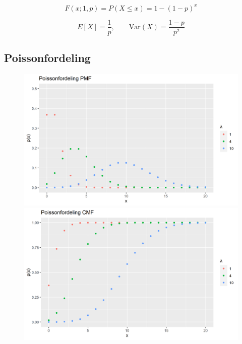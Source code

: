\begin{equation}
    F(x; 1, p) = P(X \leq x) = 1 - (1 - p)^x
\end{equation}

\begin{equation}
    E[X] = \frac{1}{p}, \qquad \text{Var}(X) = \frac{1-p}{p^2}
\end{equation}

\subsection{Poissonfordeling}
\begin{figure}[H]
  \centering
  \begin{minipage}[b]{0.49\textwidth}
    \includegraphics[width=\textwidth]{bilete/poispmf.png}
  \end{minipage}
  \hfill
  \begin{minipage}[b]{0.49\textwidth}
    \includegraphics[width=\textwidth]{bilete/poiscdf.png}
  \end{minipage}
\end{figure}


